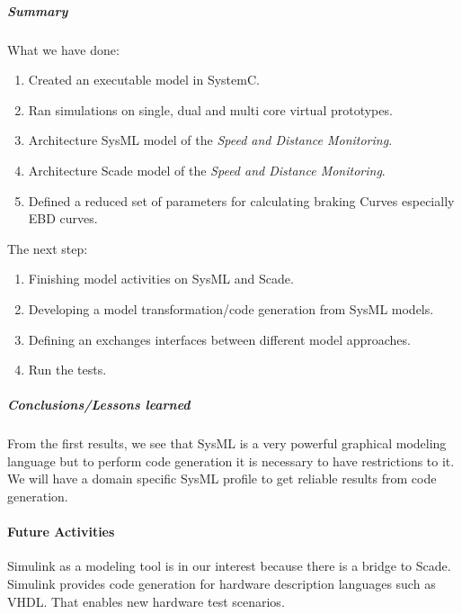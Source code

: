 \documentclass{article}
\begin{document}
\subparagraph{Summary}

What we have done:
\begin{enumerate}
\item Created an executable model in SystemC.
\item Ran simulations on single, dual and multi core virtual prototypes.
\item Architecture SysML model of the \emph{Speed and Distance Monitoring}.
\item Architecture Scade model of the \emph{Speed and Distance Monitoring}.
\item Defined a reduced set of parameters for calculating braking Curves especially EBD curves.
\end{enumerate}
 
 The next step:
 \begin{enumerate}
 \item Finishing model activities on SysML and Scade.
 \item Developing a model transformation/code generation from SysML models.
 \item Defining an exchanges interfaces between different model approaches.
 \item Run the tests.
 \end{enumerate}
\subparagraph{Conclusions/Lessons learned}
From the first results, we see that SysML is a very powerful graphical modeling language but to perform code generation it is necessary to have restrictions to it. We will have a domain specific SysML profile to get reliable results from code generation.  


\paragraph{Future Activities}
Simulink as a modeling tool is in our interest because there is a bridge to Scade. Simulink provides code generation for hardware description languages such as VHDL. That enables new hardware test scenarios.



\end{document}
